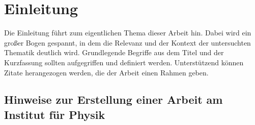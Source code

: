 
\chapter{Einleitung}

Die Einleitung führt zum eigentlichen Thema dieser Arbeit hin. Dabei wird ein großer Bogen gespannt, in dem die Relevanz und der Kontext der untersuchten Thematik deutlich wird. Grundlegende Begriffe aus dem Titel und der Kurzfassung sollten aufgegriffen und definiert werden. Unterstützend können Zitate herangezogen werden, die der Arbeit einen Rahmen geben.
\section{Hinweise zur Erstellung einer Arbeit am Institut für Physik}

